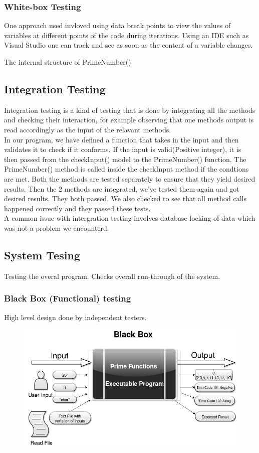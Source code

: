 \documentclass[11 pt]{article}
\begin{document}
\subsubsection{White-box Testing}
One approach used invloved using data break points to view the values of variables at different points of the code during iterations. Using an IDE such as Visual Studio one can track and see as soon as the content of a variable changes.

The internal structure of PrimeNumber()

\subsection{Integration Testing}
Integration testing is a kind of testing that is done by integrating all the methods and checking their interaction, for example observing that one methods output is read accordingly as the input of the relavant methods.\\
In our program, we have defined a function that takes in the input and then validates it to check if it conforms. If the input is valid(Positive integer), it is then passed from the checkInput() model to the PrimeNumber() function. The PrimeNumber() method is called inside the checkInput method if the condtions are met. Both the methods are tested separately to ensure that they yield desired results. Then the 2 methods are integrated, we've tested them again and got desired results. They both passed.
We also checked to see that all method calls happened correctly and they passed these tests.\\
A common issue with intergration testing involves database locking of data which was not a problem we encounterd.

\subsection{System Tesing}
Testing the overal program. Checks overall run-through of the system.
\subsubsection{Black Box (Functional) testing}
High level design done by independent testers.\\

    \begin{figure}[h]
    \centering
    
    \includegraphics[width=\linewidth]{Black Box Diagram.png}
    \end{figure}
 

 
\end{document}
